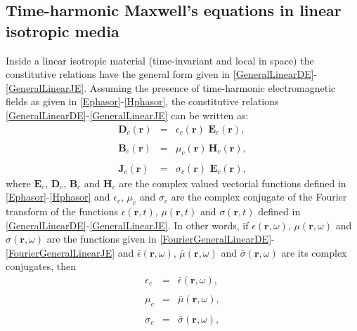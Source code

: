 \subsection{Time-harmonic Maxwell's equations in linear isotropic media}\label{MaxwellFD-LIM}

Inside a linear isotropic material (time-invariant and local in space) the constitutive relations have the general form given in \eqref{GeneralLinearDE}-\eqref{GeneralLinearJE}. Assuming the presence of time-harmonic electromagnetic fields as given in \eqref{Ephasor}-\eqref{Hphasor}, the constitutive relations \eqref{GeneralLinearDE}-\eqref{GeneralLinearJE} can be written as:
\begin{eqnarray}
    \mathbf{D}_{c}\left(\mathbf{r}\right) &=& \epsilon_{c}\left(\mathbf{r}\right)\,\, \mathbf{E}_{c}\left(\mathbf{r}\right), \label{ConstitutiveRelationDELFD}
	\\\nonumber
	\\[-1em]
	\mathbf{B}_{c}\left(\mathbf{r}\right) &=& \mu_{c}\left(\mathbf{r}\right)\, \mathbf{H}_{c}\left(\mathbf{r}\right),\label{ConstitutiveRelationBHLFD}
	\\\nonumber
	\\[-1em]
	\mathbf{J}_{c}\left(\mathbf{r}\right) &=& \sigma_{c}\left(\mathbf{r}\right)\,\, \mathbf{E}_{c}\left(\mathbf{r}\right),\label{ConstitutiveRelationJELFD}
\end{eqnarray}
where $\mathbf{E}_{c}$, $\mathbf{D}_{c}$, $\mathbf{B}_{c}$ and $\mathbf{H}_{c}$ are the complex valued vectorial functions defined in \eqref{Ephasor}-\eqref{Hphasor} and $\epsilon_{c}$, $\mu_{c}$ and $\sigma_{c}$ are the complex conjugate of the Fourier transform of the functions $\epsilon(\mathbf{r}, t)$, $\mu(\mathbf{r}, t)$ and $\sigma(\mathbf{r}, t)$ defined in \eqref{GeneralLinearDE}-\eqref{GeneralLinearJE}. In other words, if $\epsilon(\mathbf{r}, \omega)$, $\mu(\mathbf{r}, \omega)$ and $\sigma(\mathbf{r}, \omega)$ are the functions given in
\eqref{FourierGeneralLinearDE}-\eqref{FourierGeneralLinearJE} and $\bar{\epsilon}(\mathbf{r}, \omega)$, $\bar{\mu}(\mathbf{r}, \omega)$ and $\bar{\sigma}(\mathbf{r}, \omega)$ are its complex
conjugates, then 
\begin{eqnarray}
    \epsilon_{c} &=& \bar{\epsilon}(\mathbf{r},\omega),\label{ExplainingFTEp}
	\\\nonumber
	\\[-1em]
	\mu_{c} &=& \bar{\mu}(\mathbf{r},\omega),\label{ExplainingFTMu}
	\\\nonumber
	\\[-1em]
	\sigma_{c} &=& \bar{\sigma}(\mathbf{r},\omega),\label{ExplainingFTSig}
\end{eqnarray}

